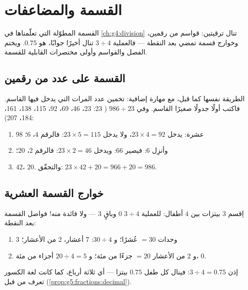 \chapter{القسمة والمضاعفات}\label{ch:g5:division}

القسمة المطوّلة التي تعلّمناها في \cref{ch:g4:division} تنال
ترقيتين: قواسم من رقمين، وخوارج قسمة تمضي بعد النقطة ---
فالعملية $3 \div 4$ تنال أخيرًا جوابًا، هو $0.75$. ويختم الفصل
 والقواسم وأولى مختصرات القابلية للقسمة.

\section{القسمة على عدد من رقمين}

\begin{method}\label{met:g5:division:twodigits}
الطريقة نفسها كما قبل، مع مهارة إضافية: تخمين عدد المرات
التي يدخل فيها القاسم. فاكتب أولًا جدولًا صغيرًا  القاسم.
وفي $986 \div 23$ ( 23: 23، 46، 69، 92، 115،
138، 161، 184، 207):
\begin{enumerate}
  \item $98$ عشرة: يدخل $23 \times 4 = 92$، ولا يدخل
        $23 \times 5 = 115$: فالرقم $4$،  $6$؛
  \item وأنزِل $6$: فيصير $66$: ويدخل $23 \times 2 = 46$: فالرقم
        $2$،  $20$؛
  \item {} $42$،  $20$. والتحقّق:
        $23 \times 42 + 20 = 966 + 20 = 986$.
\end{enumerate}
\end{method}

\section{خوارج القسمة العشرية}

\begin{example}\label{ex:g5:division:decimal}
اِقسم $3$ بيتزات بين $4$ أطفال: للعملية $3 \div 4$  $0$
وباقٍ $3$ --- ولا فائدة منه! فواصل القسمة بعد النقطة:
\begin{enumerate}
  \item $3$ وحدات $= 30$ عُشرًا؛ و $30 \div 4$: $7$ أعشار، 
        $2$ من الأعشار؛
  \item و $2$ من الأعشار $= 20$ جزءًا من مئة؛ و $20 \div 4 = 5$ أجزاء
        من مئة،  $0$.
\end{enumerate}
إذن $3 \div 4 = 0.75$: فينال كل طفل $0.75$ بيتزا --- أي ثلاثة
أرباع، كما كانت لغة الكسور تعرف من قبل
(\cref{prop:g5:fractions:decimal}).
\end{example}

